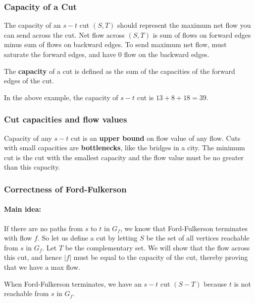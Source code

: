 \subsubsection{Capacity of a Cut}
The capacity of an $s-t$ cut $(S, T)$ should represent the maximum net flow you can send across the cut. Net flow across $(S, T)$ is sum of flows on forward edges minus sum of flows on backward edges. To send maximum net flow, must saturate the forward edges, and have 0 flow on the backward edges.
\begin{definition}
	The \textbf{capacity} of a cut is defined as the sum of the capacities of the forward edges of the cut.
\end{definition}

In the above example, the capacity of $s-t$ cut is $13 + 8 + 18 = 39$.

\subsubsection{Cut capacities and flow values}
Capacity of any $s-t$ cut is an \textbf{upper bound} on flow value of any flow. Cuts with small capacities are \textbf{bottlenecks}, like the bridges in a city. The minimum cut is the cut with the smallest capacity and the flow value must be no greater than this capacity.

\subsubsection{Correctness of Ford-Fulkerson}
\paragraph{Main idea:} If there are no paths from $s$ to $t$ in $G_f$, we know that Ford-Fulkerson terminates with flow $f$. So let us define a cut by letting $S$ be the set of all vertices reachable from $s$ in $G_f$. Let $T$ be the complementary set. We will show that the flow across this cut, and hence $|f|$ must be equal to the capacity of the cut, thereby proving that we have a max flow.

When Ford-Fulkerson terminates, we have an $s-t$ cut $(S-T)$ because $t$ is not
reachable from $s$ in $G_f$.

